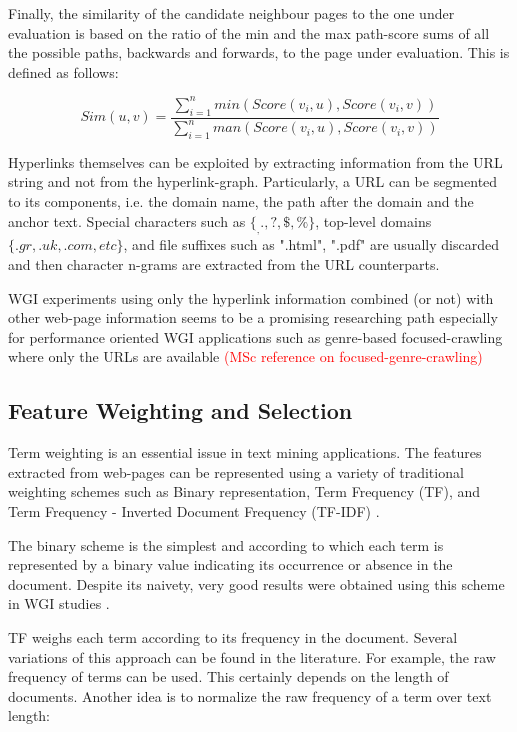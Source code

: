 Finally, the similarity of the candidate neighbour pages to the one under evaluation is based on the ratio of the min and the max path-score sums of all the possible paths, backwards and forwards, to the page under evaluation. This is defined as follows:

\begin{equation}\label{eq:GenreSim_Selection_Score}
	Sim(u, v) = \frac{\sum_{i=1}^{n} min(Score(v_{i}, u), Score(v_{i}, v))}{\sum_{i=1}^{n} man(Score(v_{i}, u), Score(v_{i}, v))}
\end{equation}

Hyperlinks themselves can be exploited by extracting information from the URL string and not from the hyperlink-graph. Particularly, a URL can be segmented to its components, i.e. the domain name, the path after the domain and the anchor text. Special characters such as $\{_ , . , ?, \$ , \%\}$, top-level domains $\{.gr , .uk , .com, etc\}$, and file suffixes such as ".html", ".pdf" are usually discarded and then character n-grams are extracted from the URL counterparts. 

WGI experiments using only the hyperlink information combined (or not) with other web-page information seems to be a promising researching path especially for performance oriented WGI applications such as genre-based focused-crawling where only the URLs are available \parencite{jebari2014pureURL,jebari2015combination,abramson2012_URL,priyatam2013don_URL} 
\textcolor{red}{(MSc reference on focused-genre-crawling)}

\subsection{Feature Weighting and Selection}

Term weighting is an essential issue in text mining applications. The features extracted from web-pages can be represented using a variety of  traditional weighting schemes such as Binary representation, Term Frequency (TF), and Term Frequency - Inverted Document Frequency (TF-IDF) . 

The binary scheme is the simplest and according to which each term is represented by a binary value indicating its occurrence or absence in the document. Despite its naivety, very good results were obtained using this scheme in WGI studies .

TF weighs each term according to its frequency in the document. Several variations of this approach can be found in the literature. For example, the raw frequency of terms can be used. This certainly depends on the length of documents. Another idea is to normalize the raw frequency of a term over text length:

